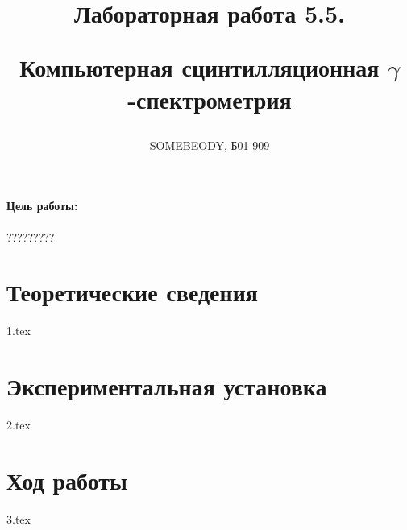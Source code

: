 \documentclass[a5paper, 10pt, twoside]{article} %
\title
{\hfill \break  \hfill \break
\hfill \break  \hfill \break
Лабораторная работа 5.5.

Компьютерная сцинтилляционная $\gamma$-спектрометрия}
\author{SOMEBEODY, Б01-909}
\begin{document}
\maketitle



\thispagestyle{empty} %

\newpage

\tableofcontents %
\thispagestyle{plain}
\newpage


\paragraph{Цель работы:}

?????????

\section{Теоретические сведения}
{1.tex}

\section{Экспериментальная установка}
{2.tex}

\section{Ход работы}
{3.tex}
\end{document}
